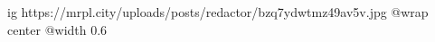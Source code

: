  
 
 
 
 

\ifcmt
  ig https://mrpl.city/uploads/posts/redactor/bzq7ydwtmz49av5v.jpg
  @wrap center
  @width 0.6
\fi
